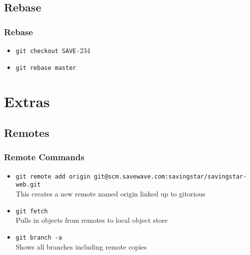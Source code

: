 \subsection{Rebase}

\begin{frame}
  \frametitle{Rebase}
  \begin{itemize}
    \item \texttt{git checkout SAVE-}234
    \item \texttt{git rebase master}
  \end{itemize}
   { }
   { }
\end{frame}

\section{Extras}

\subsection{Remotes}

\begin{frame}
  \frametitle{Remote Commands}
  \begin{itemize}
  \item \texttt{git remote add origin git@scm.savewave.com:savingstar/savingstar-web.git}
    \\ This creates a new remote named origin linked up to gitorious
    \pause
  \item \texttt{git fetch}
    \\ Pulls in objects from remotes to local object store
    \pause
  \item \texttt{git branch -a}
    \\ Shows all branches including remote copies
  \end{itemize}
\end{frame}

